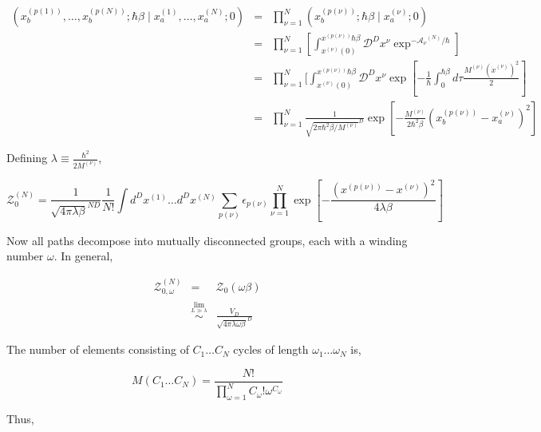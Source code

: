 \documentclass[aps,preprint,showpacs,superscriptaddress,groupedaddress]{revtex4}  %
\begin{document}
\begin{eqnarray}
  (x_{b}^{(p(1))},\dots,x_{b}^{(p(N))};\hbar \beta \mid x_{a}^{(1)},\dots,x_{a}^{(N)};0) &=& \prod_{\nu=1}^{N} (x_{b}^{(p(\nu))};\hbar \beta \mid x_{a}^{(\nu)};0) \\
                                                                                         &=& \prod_{\nu=1}^{N} [\int_{x^{(\nu)}(0)}^{x^{(p(\nu))}\hbar\beta} \mathcal{D}^{D}x^{\nu}\exp^{-\mathcal{A_{\nu}}^{(N)}/\hbar}] \\
                                                                                         &=& \prod_{\nu=1}^{N} [\int_{x^{(\nu)}(0)}^{x^{(p(\nu))}\hbar\beta} \mathcal{D}^{D}x^{\nu}\exp{[-\frac{1}{\hbar} \int_{0}^{\hbar\beta}d\tau \frac{M^{(\nu)} (\dot{x}^{(\nu)})^{2}}{2}]} \\
                                                                                         &=& \prod_{\nu=1}^{N} \frac{1}{\sqrt{2\pi\hbar^{2}\beta/M^{(\nu)}}^{D}} \exp{[-\frac{M^{(\nu)}}{2\hbar^{2}\beta} (x_{b}^{(p(\nu))} - x_{a}^{(\nu)})^{2}]}
\end{eqnarray}

Defining $\lambda \equiv \frac{\hbar^{2}}{2M^{(\nu)}}$,

\begin{equation}
  \mathcal{Z}^{(N)}_{0} = \frac{1}{\sqrt{4\pi\lambda\beta}^{ND}} \frac{1}{N!} \int d^{D}x^{(1)} \dots d^{D}x^{(N)} \sum_{p(\nu)} \epsilon_{p(\nu)} \prod_{\nu=1}^{N} \exp{[-\frac{(x^{(p(\nu))}-x^{(\nu)})^{2}}{4\lambda\beta}]}
\end{equation}

Now all paths decompose into mutually disconnected groups, each with a winding number $\omega$. In general,

\begin{eqnarray}
  \mathcal{Z}^{(N)}_{0,\omega} &=& \mathcal{Z}_{0}(\omega\beta) \\
                               &\overset{\lim_{L \gg \lambda}}{\sim}& \frac{V_{D}}{\sqrt{4\pi\lambda\omega\beta}^{D}}
\end{eqnarray}

The number of elements consisting of $C_{1} \dots C_{N}$ cycles of length $\omega_{1} \dots \omega_{N}$ is,

\begin{equation}
  M(C_{1} \dots C_{N}) = \frac{N!}{\prod_{\omega=1}^{N} C_{\omega}! \omega^{C_{\omega}}}
\end{equation}

Thus,
\end{document}
